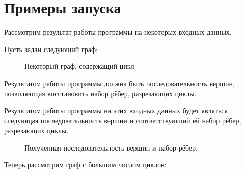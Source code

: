 \documentclass[spec, och, otchet, hidelinks]{SCWorks}
\begin{document}
\newpage 

\section*{Примеры запуска}

\par Рассмотрим результат работы программы на некоторых входных данных.

Пусть задан следующий граф:

\begin{figure}[h]
	\caption{Некоторый граф, содержащий цикл.}
\end{figure}

Результатом работы программы должна быть последовательность вершин, позволяющая восстановить набор рёбер, разрезающих циклы. 

Результатом работы программы на этих входных данных будет являться следующая последовательность вершин и соответствующий ей набор рёбер, разрезающих циклы.

\begin{figure}[h]
	\caption{Полученная последовательность вершин и набор рёбер.}
\end{figure}

\newpage

Теперь рассмотрим граф с большим числом циклов:
\end{document}
